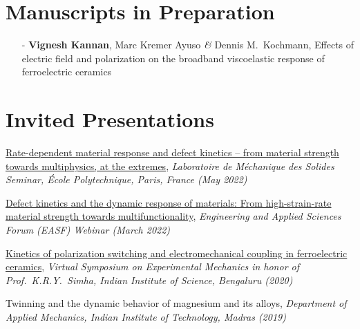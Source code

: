 \documentclass[a4paper,10pt, oneside]{article}
\begin{document}
	\section*{{Manuscripts in Preparation}}
	\begin{itemize}[wide, labelwidth=!, labelindent=0em]
		\itemsep0em
		\item[-] \textbf{Vignesh Kannan}, Marc Kremer Ayuso \emph{\&} Dennis M.~Kochmann, Effects of electric field and polarization on the broadband viscoelastic response of ferroelectric ceramics \label{ferrovisco1}
	\end{itemize}

	\section*{{Invited Presentations}}
	\begin{enumerate}[label={[\arabic*]}, leftmargin=*]
		\itemsep 5pt
		\item \href{https://www.youtube.com/watch?v=YmLRJPUaMiw}{Rate-dependent material response and defect kinetics -- from material strength towards multiphysics, at the extremes}, \textit{Laboratoire de M\'{e}chanique des Solides Seminar, \'{E}cole Polytechnique, Paris, France (May 2022)} \label{ecole2022}
		\item \href{https://www.youtube.com/watch?v=KJaa1TNWZrM&t=2661s}{Defect kinetics and the dynamic response of materials: From high-strain-rate material strength towards multifunctionality}, \textit{Engineering and Applied Sciences Forum (EASF) Webinar (March 2022)} \label{easf2022}
		\item \href{https://www.youtube.com/watch?v=U4-B_NNvWPY&ab_channel=IIScMechanicalEngineering}{Kinetics of polarization switching and electromechanical coupling in ferroelectric ceramics},\textit{ Virtual Symposium on Experimental Mechanics in honor of Prof.~K.R.Y.~Simha, Indian Institute of Science, Bengaluru (2020)} \label{iiscsimha2020}
		\item Twinning and the dynamic behavior of magnesium and its alloys, \textit{Department of Applied Mechanics, Indian Institute of Technology, Madras (2019)} \label{iitm2019}
	\end{enumerate}
	
\end{document}
